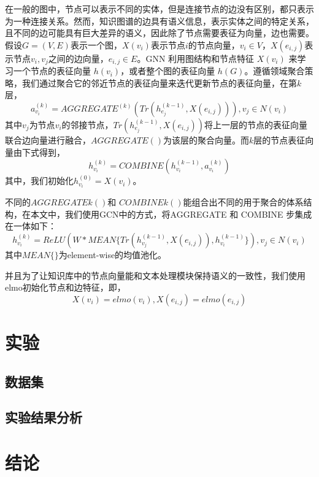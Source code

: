 在一般的图中，节点可以表示不同的实体，但是连接节点的边没有区别，都只表示为一种连接关系。然而，知识图谱的边具有语义信息，表示实体之间的特定关系，且不同的边可能具有巨大差异的语义，因此除了节点需要表征为向量，边也需要。假设$G = (V, E)$表示一个图，$X(v_i)$表示节点$i$的节点向量，$v_i \in V $，$X(e_{i,j})$表示节点$v_i, v_j$之间的边向量，$e_{i,j} \in E$。GNN 利用图结构和节点特征 $X(v_i)$ 来学习一个节点的表征向量 $h(v_i)$，或者整个图的表征向量 $h(G)$。遵循领域聚合策略，我们通过聚合它的邻近节点的表征向量来迭代更新节点的表征向量，在第$k$层，
\begin{equation}
a_{v_i}^{(k)} = AGGREGATE^{(k)}(Tr(h_{e_j}^{(k-1)}, X(e_{i,j}))), v_j \in N(v_i)
\end{equation}
其中$v_j$为节点$v_i$的邻接节点，$Tr(h_{e_j}^{(k-1)}, X(e_{i,j}))$将上一层的节点的表征向量联合边向量进行融合，$AGGREGATE()$为该层的聚合向量。而$k$层的节点表征向量由下式得到，
\begin{equation}
h_{v_i}^{(k)} = COMBINE(h_{v_i}^{(k-1)}, a_{v_i}^{(k)})
\end{equation}
其中，我们初始化$h_{v_i}^{(0)}=X(v_i)$。

不同的$AGGREGATE{k}() $和 $COMBINE{k}() $能组合出不同的用于聚合的体系结构，在本文中，我们使用GCN中的方式，将AGGREGATE 和 COMBINE 步集成在一体如下：
\begin{equation}
h_{v_i}^{(k)} = ReLU(W*MEAN\{Tr(h_{v_j}^{(k-1)}, X(e_{i,j})), h_{v_i}^{(k-1)}\}), v_j \in N(v_i)
\end{equation}
其中$MEAN\{\}$为element-wise的均值池化。

并且为了让知识库中的节点向量能和文本处理模块保持语义的一致性，我们使用elmo初始化节点和边特征，即，
\begin{equation}
X(v_i) = elmo(v_i),
X(e_{i,j}) = elmo(e_{i,j})
\end{equation}

\section{实验}
\subsection{数据集}
\subsection{实验结果分析}

\section{结论}
